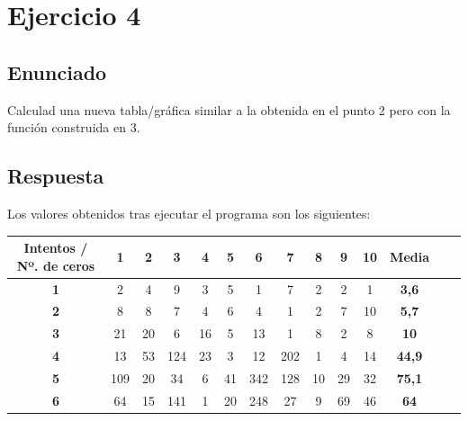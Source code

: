 \documentclass[10pt,a4paper,spanish]{report}
\begin{document}
\chapter{Ejercicio 4}

\section{Enunciado}
\noindent
Calculad una nueva tabla/gráfica similar a la obtenida en el punto 2 pero con la función construida en 3.

\section{Respuesta}
\noindent
Los valores obtenidos tras ejecutar el programa son los siguientes:

\begin{table}[h!]
 \centering
 \begin{adjustbox}{max width=\textwidth}
  \begin{tabular}{*{14}{|c}|} %
   \hline
   \textbf{Intentos / Nº. de ceros} & \textbf{1} & \textbf{2} & \textbf{3} & \textbf{4} & \textbf{5} & \textbf{6} & \textbf{7} & \textbf{8} & \textbf{9} & \textbf{10} & \textbf{Media}      \\ \hline
   \textbf{1}                       & 2          & 4          & 9          & 3          & 5          & 1          & 7          & 2          & 2          & 1           & \textbf{3,6}        \\ \hline
   \textbf{2}                       & 8          & 8          & 7          & 4          & 6          & 4          & 1          & 2          & 7          & 10          & \textbf{5,7}        \\ \hline
   \textbf{3}                       & 21         & 20         & 6          & 16         & 5          & 13         & 1          & 8          & 2          & 8           & \textbf{10}         \\ \hline
   \textbf{4}                       & 13         & 53         & 124        & 23         & 3          & 12         & 202        & 1          & 4          & 14          & \textbf{44,9}       \\ \hline
   \textbf{5}                       & 109        & 20         & 34         & 6          & 41         & 342        & 128        & 10         & 29         & 32          & \textbf{75,1}       \\ \hline
   \textbf{6}                       & 64         & 15         & 141        & 1          & 20         & 248        & 27         & 9          & 69         & 46          & \textbf{64}         \\ \hline

\end{tabular}
\end{adjustbox}
\end{table}
\end{document}
